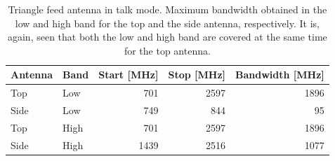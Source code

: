 \begin{table}[htbp]
    \centering
    \begin{tabular}{|l|l|r|r|r|}
        \hline
        Antenna & Band & Start [MHz] & Stop [MHz] & Bandwidth [MHz] \\
        \hline
        Top     & Low  & 701         & 2597       & 1896 \\
        Side    & Low  & 749         & 844        & 95   \\
        \hline
        Top     & High & 701         & 2597       & 1896 \\
        Side    & High & 1439        & 2516       & 1077 \\
        \hline
    \end{tabular}
    \caption{Triangle feed antenna in talk mode. Maximum bandwidth obtained in the low and high band for the top and the side antenna, respectively. It is, again, seen that both the low and high band are covered at the same time for the top antenna.}
    \label{tab:bw_sol2talk}
\end{table}

